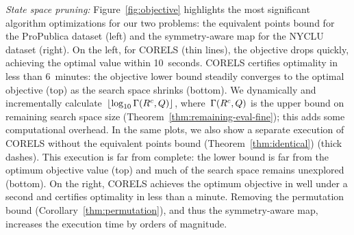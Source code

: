 \textit{State space pruning:}
Figure~\ref{fig:objective} highlights the most significant
algorithm optimizations for our two problems:
the equivalent points bound for the ProPublica dataset (left)
and the symmetry-aware map for the NYCLU dataset (right).
%
On the left, for CORELS (thin lines),
the objective drops quickly, achieving the optimal value within 10~seconds.
%
CORELS certifies optimality in less than 6~minutes:
the objective lower bound steadily converges to the optimal objective (top)
as the search space shrinks (bottom).
%
We dynamically and incrementally
calculate~$\lfloor \log_{10} \Gamma({R^c}, Q) \rfloor$,
where~$\Gamma({R^c}, Q)$
is the upper bound on remaining search space size
(Theorem~\ref{thm:remaining-eval-fine});
this adds some computational overhead.
%
In the same plots, we also show
a separate execution of CORELS without the equivalent points bound
(Theorem~\ref{thm:identical}) (thick dashes).
%
This execution is far from complete:
the lower bound is far from the optimum objective value (top)
and much of the search space remains unexplored (bottom).
%
On the right,
CORELS achieves the optimum objective in well under a second
and certifies optimality in less than a minute.
%
Removing the permutation bound (Corollary~\ref{thm:permutation}),
and thus the symmetry-aware map,
increases the execution time by orders of magnitude.
